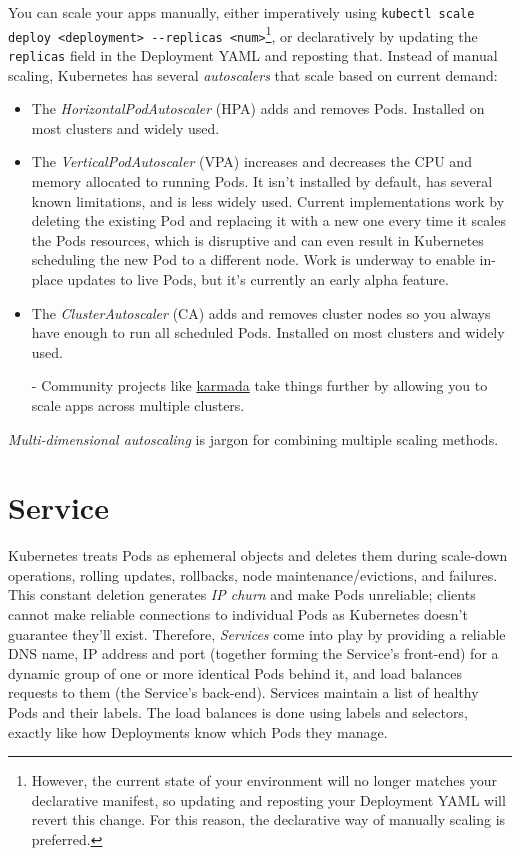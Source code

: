 \documentclass[8pt, table, xcdraw]{article}%
\begin{document}
You can scale your apps manually, either imperatively using \lstinline{kubectl scale deploy <deployment> --replicas <num>}\footnote{However, the current state of your environment will no longer matches your declarative manifest, so updating and reposting your Deployment YAML will revert this change. For this reason, the declarative way of manually scaling is preferred.}, or declaratively by updating the \lstinline{replicas} field in the Deployment YAML and reposting that. Instead of manual scaling, Kubernetes has several \emph{autoscalers} that scale based on current demand:

\begin{itemize}
    \item The \emph{HorizontalPodAutoscaler} (HPA) adds and removes Pods. Installed on most clusters and widely used.
    \item The \emph{VerticalPodAutoscaler} (VPA) increases and decreases the CPU and memory allocated to running Pods. It isn’t installed by default, has several known limitations, and is less widely used. Current implementations work by deleting the existing Pod and replacing it with a new one every time it scales the Pods resources, which is disruptive and can even result in Kubernetes scheduling the new Pod to a different node. Work is underway to enable in-place updates to live Pods, but it’s
    currently an early alpha feature.
    \item The \emph{ClusterAutoscaler} (CA) adds and removes cluster nodes so you always have enough to run all scheduled Pods. Installed on most clusters and widely used.
    \item[-] Community projects like \href{https://karmada.io/}{karmada} take things further by allowing you to scale apps across multiple clusters.
\end{itemize}

\emph{Multi-dimensional autoscaling} is jargon for combining multiple scaling methods.

\section{Service}

Kubernetes treats Pods as ephemeral objects and deletes them during scale-down operations, rolling updates, rollbacks, node maintenance/evictions, and failures. This constant deletion generates \emph{IP churn} and make Pods unreliable; clients cannot make reliable connections to individual Pods as Kubernetes doesn’t guarantee they’ll exist. Therefore, \emph{Services} come into play by providing a reliable DNS name, IP address and port (together forming the Service's front-end) for a dynamic group of one or more identical Pods behind it, and load balances requests to them (the Service's back-end). Services maintain a list of healthy Pods and their labels. The load balances is done using labels and selectors, exactly like how Deployments know which Pods they manage.
\end{document}
